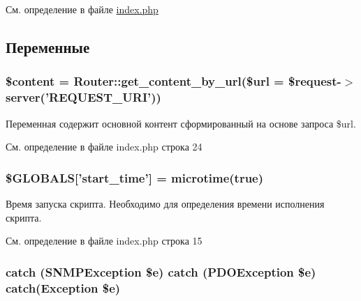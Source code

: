 См. определение в файле \hyperlink{index_8php_source}{index.\-php}



\subsection{Переменные}
\hypertarget{index_8php_a57b284fe00866494b33afa80ba729bed}{
\subsubsection[{\$content}]{\setlength{\rightskip}{0pt plus 5cm}\$content = {\bf Router\-::get\-\_\-content\-\_\-by\-\_\-url}(\$url = \$request-\/$>$server('R\-E\-Q\-U\-E\-S\-T\-\_\-\-U\-R\-I'))}}\label{index_8php_a57b284fe00866494b33afa80ba729bed}


Переменная содержит основной контент сформированный на основе запроса \$url. 



См. определение в файле index.\-php строка 24

\hypertarget{index_8php_a1e4daea35abc15dd2599d5c8551ccba0}{
\subsubsection[{\$\-G\-L\-O\-B\-A\-L\-S}]{\setlength{\rightskip}{0pt plus 5cm}\$G\-L\-O\-B\-A\-L\-S\mbox{[}'start\-\_\-time'\mbox{]} = microtime(true)}}\label{index_8php_a1e4daea35abc15dd2599d5c8551ccba0}


Время запуска скрипта. Необходимо для определения времени исполнения скрипта. 



См. определение в файле index.\-php строка 15

\hypertarget{index_8php_a51a795867632fb0101bd436c945c49ab}{
\subsubsection[{catch}]{\setlength{\rightskip}{0pt plus 5cm}catch (S\-N\-M\-P\-Exception \$e) catch (P\-D\-O\-Exception \$e) catch(Exception \$e)}}\label{index_8php_a51a795867632fb0101bd436c945c49ab}


